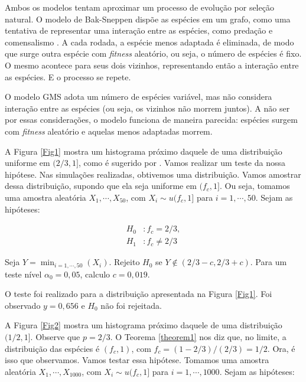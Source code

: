\documentclass[10pt,brazil,english]{article}
\begin{document}
        Ambos os modelos tentam aproximar um processo de evolução por seleção natural.
        O modelo de Bak-Sneppen dispõe as espécies em um grafo, como uma tentativa de representar uma interação entre as espécies, como predação e comensalismo \cite{khouri2013estudos}.
        A cada rodada, a espécie menos adaptada é eliminada, de modo que surge outra espécie com \textit{fitness} aleatório, ou seja, o número de espécies é fixo.
        O mesmo acontece para seus dois vizinhos, representando então a interação entre as espécies.
        E o processo se repete.

        O modelo GMS adota um número de espécies variável, mas não considera interação entre as espécies (ou seja, os vizinhos não morrem juntos).
        A não ser por essas considerações, o modelo funciona de maneira parecida: espécies surgem com \textit{fitness} aleatório e aquelas menos adaptadas morrem.

        A Figura \ref{Fig1} mostra um histograma próximo daquele de uma distribuição uniforme em $(2/3, 1]$, como é sugerido por .
        Vamos realizar um teste da nossa hipótese.
        Nas simulações realizadas, obtivemos uma distribuição.
        Vamos amostrar dessa distribuição, supondo que ela seja uniforme em $(f_c, 1]$.
        Ou seja, tomamos uma amostra aleatória $X_1, \cdots, X_{50}$, com $X_i \sim u(f_c, 1]$ para $i = 1, \cdots, 50$.
        Sejam as hipóteses:

        \begin{equation}
            \label{eq1}
            \begin{aligned}
                H_0&: f_c = 2/3, \\
                H_1&: f_c \neq 2/3
            \end{aligned}
        \end{equation}

        Seja $Y = \min_{i = 1, \cdots, 50}(X_i)$. Rejeito $H_0$ se $Y \notin (2/3 - c, 2/3 + c)$.
        Para um teste nível $\alpha_0 = 0,05$, calculo $c = 0,019$.

        O teste foi realizado para a distribuição apresentada na Figura \ref{Fig1}.
        Foi observado $y = 0,656$ e $H_0$ não foi rejeitada.

        A Figura \ref{Fig2} mostra um histograma próximo daquele de uma distribuição $(1/2, 1]$. Observe que $p = 2/3$.
        O Teorema \ref{theorem1} nos diz que, no limite, a distribuição das espécies é $(f_c, 1)$, com $f_c = (1 - 2/3)/(2/3) = 1/2$.
        Ora, é isso que observamos. Vamos testar essa hipótese.
        Tomamos uma amostra aleatória $X_1, \cdots, X_{1000}$, com $X_i \sim u(f_c, 1]$ para $i = 1, \cdots, 1000$.
        Sejam as hipóteses:
\end{document}
